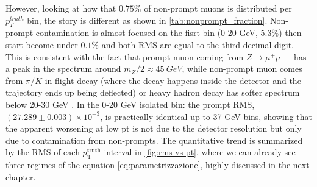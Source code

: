 \documentclass[11pt,a4paper,twoside,openright]{report}
\begin{document}
\noindent However, looking at how that \(0.75\%\) of non-prompt muons is distributed per \(p_T^{truth}\) bin, the story is different as shown in \cref{tab:nonprompt_fraction}. Non-prompt contamination is almost focused on the fisrt bin (0-20 GeV, \(5.3\%\)) then start become under \(0.1\%\) and both RMS are egual to the third decimal digit. This is consistent with the fact that prompt muon coming from \(Z\rightarrow\mu^+\mu-\) has a peak in the spectrum around \(m_Z/2\approx45\ GeV\), while non-prompt muon comes from \(\pi/K\) in-flight decay (where the decay happens inside the detector and the trajectory ends up being deflected) or heavy hadron decay has softer spectrum below 20-30 GeV \cite{ATLAS-MUON-EFF-2021}. In the 0-20 GeV isolated bin: the prompt RMS, $(27.289\pm 0.003) \times 10^{-3}$, is practically identical up to 37 GeV bins, showing that the apparent worsening at low pt is not due to the detector resolution but only due to contamination from non-prompts. The quantitative trend is summarized by the RMS of each $p_{\mathrm{T}}^\mathrm{truth}$ interval in \cref{fig:rms-vs-pt}, where we can already see three regimes of the equation \eqref{eq:parametrizzazione}, highly discussed in the next chapter. 
\end{document}
